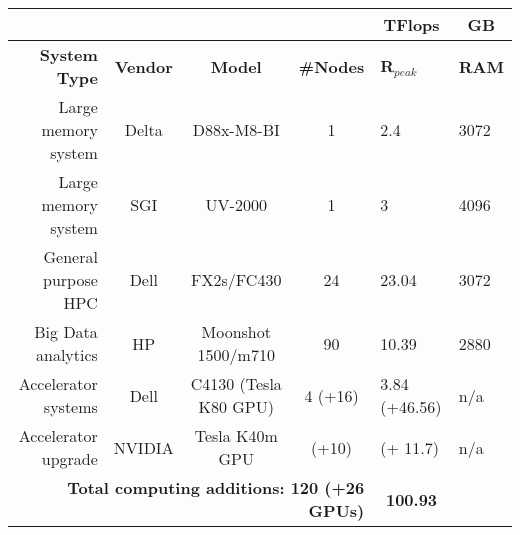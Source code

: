 % 
% 
% 

\begin{table}[b]
  \centering\scriptsize
  \begin{tabular}{|r||c|c|c|l|l|}
    \multicolumn{4}{c}{}  & \multicolumn{1}{c}{TFlops} & \multicolumn{1}{c}{GB}\\\hline
    \rowcolor{lightgray}
    \textbf{System Type}  & \textbf{Vendor} & \textbf{Model} & \textbf{\#Nodes} & \textbf{R$_{peak}$} & \textbf{RAM} \\\hline
    \hline
    Large memory system   & Delta           & D88x-M8-BI             & 1        & 2.4   &  3072 \\
    Large memory system   & SGI             & UV-2000                & 1        & 3     &  4096 \\
    General purpose HPC   & Dell            & FX2s/FC430             & 24       & 23.04 &  3072 \\
    Big Data analytics    & HP              & Moonshot 1500/m710     & 90       & 10.39 &  2880 \\
    Accelerator systems   & Dell            &  C4130 (Tesla K80 GPU) & 4 (+16)  & 3.84 (+46.56) & n/a \\
    Accelerator upgrade   & NVIDIA          & Tesla K40m GPU         & (+10)    & (+ 11.7)      & n/a  \\
    \hline
    \multicolumn{4}{r}{\textbf{Total computing additions: 120 (+26 GPUs)}} & \multicolumn{1}{c}{\textbf{100.93}} \\%
  \end{tabular}
\end{table}


% 
